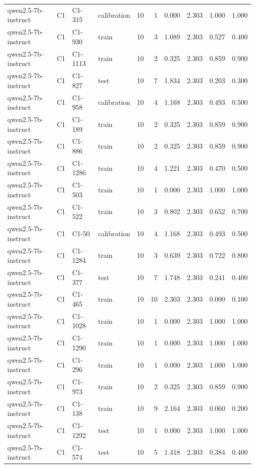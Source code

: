 \begin{table}
\begin{tabular}{llllrrrrrr}
qwen2.5-7b-instruct & C1 & C1-315 & calibration & 10 & 1 & 0.000 & 2.303 & 1.000 & 1.000 \\
qwen2.5-7b-instruct & C1 & C1-930 & train & 10 & 3 & 1.089 & 2.303 & 0.527 & 0.400 \\
qwen2.5-7b-instruct & C1 & C1-1113 & train & 10 & 2 & 0.325 & 2.303 & 0.859 & 0.900 \\
qwen2.5-7b-instruct & C1 & C1-827 & test & 10 & 7 & 1.834 & 2.303 & 0.203 & 0.300 \\
qwen2.5-7b-instruct & C1 & C1-958 & calibration & 10 & 4 & 1.168 & 2.303 & 0.493 & 0.500 \\
qwen2.5-7b-instruct & C1 & C1-189 & train & 10 & 2 & 0.325 & 2.303 & 0.859 & 0.900 \\
qwen2.5-7b-instruct & C1 & C1-886 & train & 10 & 2 & 0.325 & 2.303 & 0.859 & 0.900 \\
qwen2.5-7b-instruct & C1 & C1-1286 & train & 10 & 4 & 1.221 & 2.303 & 0.470 & 0.500 \\
qwen2.5-7b-instruct & C1 & C1-503 & train & 10 & 1 & 0.000 & 2.303 & 1.000 & 1.000 \\
qwen2.5-7b-instruct & C1 & C1-522 & train & 10 & 3 & 0.802 & 2.303 & 0.652 & 0.700 \\
qwen2.5-7b-instruct & C1 & C1-50 & calibration & 10 & 4 & 1.168 & 2.303 & 0.493 & 0.500 \\
qwen2.5-7b-instruct & C1 & C1-1284 & train & 10 & 3 & 0.639 & 2.303 & 0.722 & 0.800 \\
qwen2.5-7b-instruct & C1 & C1-377 & test & 10 & 7 & 1.748 & 2.303 & 0.241 & 0.400 \\
qwen2.5-7b-instruct & C1 & C1-465 & train & 10 & 10 & 2.303 & 2.303 & 0.000 & 0.100 \\
qwen2.5-7b-instruct & C1 & C1-1028 & train & 10 & 1 & 0.000 & 2.303 & 1.000 & 1.000 \\
qwen2.5-7b-instruct & C1 & C1-1290 & train & 10 & 1 & 0.000 & 2.303 & 1.000 & 1.000 \\
qwen2.5-7b-instruct & C1 & C1-296 & train & 10 & 1 & 0.000 & 2.303 & 1.000 & 1.000 \\
qwen2.5-7b-instruct & C1 & C1-973 & train & 10 & 2 & 0.325 & 2.303 & 0.859 & 0.900 \\
qwen2.5-7b-instruct & C1 & C1-138 & train & 10 & 9 & 2.164 & 2.303 & 0.060 & 0.200 \\
qwen2.5-7b-instruct & C1 & C1-1292 & test & 10 & 1 & 0.000 & 2.303 & 1.000 & 1.000 \\
qwen2.5-7b-instruct & C1 & C1-574 & test & 10 & 5 & 1.418 & 2.303 & 0.384 & 0.400 \\

\end{tabular}
\end{table}
